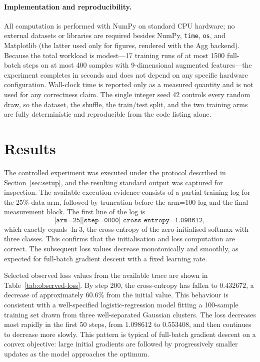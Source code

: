 \documentclass{article}
\begin{document}
\paragraph{Implementation and reproducibility.}
All computation is performed with NumPy on standard CPU hardware; no external datasets or libraries are required besides NumPy, \texttt{time}, \texttt{os}, and Matplotlib (the latter used only for figures, rendered with the Agg backend). Because the total workload is modest---17 training runs of at most 1500 full-batch steps on at most 400 samples with 9-dimensional augmented features---the experiment completes in seconds and does not depend on any specific hardware configuration. Wall-clock time is reported only as a measured quantity and is not used for any correctness claim. The single integer seed 42 controls every random draw, so the dataset, the shuffle, the train/test split, and the two training arms are fully deterministic and reproducible from the code listing alone.

\section{Results}
\label{sec:results}

The controlled experiment was executed under the protocol described in Section~\ref{sec:setup}, and the resulting standard output was captured for inspection. The available execution evidence consists of a partial training log for the 25\%-data arm, followed by truncation before the arm=100 log and the final measurement block. The first line of the log is
\[
\texttt{[arm=25][step=0000]\ cross\_entropy=1.098612},
\]
which exactly equals \(\ln 3\), the cross-entropy of the zero-initialised softmax with three classes. This confirms that the initialisation and loss computation are correct. The subsequent loss values decrease monotonically and smoothly, as expected for full-batch gradient descent with a fixed learning rate.

Selected observed loss values from the available trace are shown in Table~\ref{tab:observed-loss}. By step 200, the cross-entropy has fallen to \(0.432672\), a decrease of approximately \(60.6\%\) from the initial value. This behaviour is consistent with a well-specified logistic-regression model fitting a 100-sample training set drawn from three well-separated Gaussian clusters. The loss decreases most rapidly in the first 50 steps, from \(1.098612\) to \(0.553408\), and then continues to decrease more slowly. This pattern is typical of full-batch gradient descent on a convex objective: large initial gradients are followed by progressively smaller updates as the model approaches the optimum.
\end{document}
